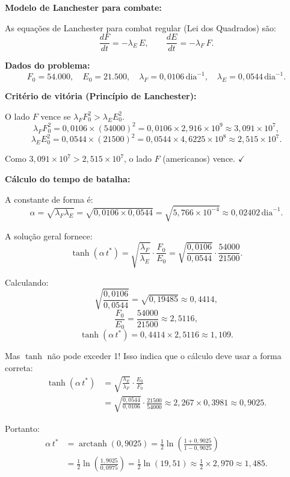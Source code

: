 \textbf{Modelo de Lanchester para combate:}

As equações de Lanchester para combat regular (Lei dos Quadrados) são:
\[
\frac{dF}{dt} = -\lambda_E\,E,\qquad \frac{dE}{dt} = -\lambda_F\,F.
\]

\textbf{Dados do problema:}
\[
F_0=54{.}000,\quad E_0=21{.}500,\quad \lambda_F=0{,}0106\,\text{dia}^{-1},\quad \lambda_E=0{,}0544\,\text{dia}^{-1}.
\]

\textbf{Critério de vitória (Princípio de Lanchester):}

O lado $F$ vence se $\lambda_F F_0^2 > \lambda_E E_0^2$.
\[
\lambda_F F_0^2 = 0{,}0106\times(54000)^2 = 0{,}0106\times2{,}916\times10^9 \approx 3{,}091\times10^7,
\]
\[
\lambda_E E_0^2 = 0{,}0544\times(21500)^2 = 0{,}0544\times4{,}6225\times10^8 \approx 2{,}515\times10^7.
\]

Como $3{,}091\times10^7 > 2{,}515\times10^7$, o lado $F$ (americanos) vence. $\checkmark$

\textbf{Cálculo do tempo de batalha:}

A constante de forma é:
\[
\alpha = \sqrt{\lambda_F\lambda_E} = \sqrt{0{,}0106\times0{,}0544} = \sqrt{5{,}766\times10^{-4}} \approx 0{,}02402\,\text{dia}^{-1}.
\]

A solução geral fornece:
\[
\tanh(\alpha\,t^*) = \sqrt{\frac{\lambda_F}{\lambda_E}}\cdot\frac{F_0}{E_0} = \sqrt{\frac{0{,}0106}{0{,}0544}}\cdot\frac{54000}{21500}.
\]

Calculando:
\[
\sqrt{\frac{0{,}0106}{0{,}0544}} = \sqrt{0{,}19485} \approx 0{,}4414,
\]
\[
\frac{F_0}{E_0}=\frac{54000}{21500}\approx2{,}5116,
\]
\[
\tanh(\alpha\,t^*)=0{,}4414\times2{,}5116\approx1{,}109.
\]

Mas $\tanh$ não pode exceder 1! Isso indica que o cálculo deve usar a forma correta:
\[
\begin{split}
\tanh(\alpha\,t^*) &= \sqrt{\frac{\lambda_E}{\lambda_F}}\cdot\frac{E_0}{F_0} \\
&= \sqrt{\frac{0{,}0544}{0{,}0106}}\cdot\frac{21500}{54000}\approx 2{,}267\times0{,}3981\approx0{,}9025.
\end{split}
\]

Portanto:
\[
\begin{split}
\alpha\,t^* &= \operatorname{arctanh}(0{,}9025) = \frac{1}{2}\ln\!\left(\frac{1+0{,}9025}{1-0{,}9025}\right) \\
&= \frac{1}{2}\ln\!\left(\frac{1{,}9025}{0{,}0975}\right) = \frac{1}{2}\ln(19{,}51) \approx \frac{1}{2}\times2{,}970 \approx 1{,}485.
\end{split}
\]

